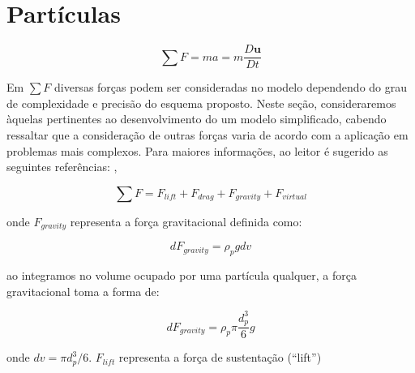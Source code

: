 \typeout{ ====================================================================}
\typeout{ ====================================================================}

\section{Partículas}

\begin{equation}
	\sum F = ma = m \frac{D \mathbf{u}}{D t}
\end{equation}

Em $\sum F$ diversas forças podem ser consideradas no modelo dependendo
do grau de complexidade e precisão do esquema proposto. Neste seção,
consideraremos àquelas pertinentes ao desenvolvimento do um modelo
simplificado, cabendo ressaltar que a consideração de outras forças
varia de acordo com a aplicação em problemas mais complexos. Para
maiores informações, ao leitor é sugerido as seguintes referências:
\cite{crowe2012}, 

\begin{equation}
	\sum F = F_{lift} + F_{drag} + F_{gravity} + F_{virtual}
\end{equation}

\noindent onde $F_{gravity}$ representa a força gravitacional definida
como: 

\begin{equation}
	dF_{gravity}
	=
	\rho_p g dv
\end{equation}

ao integramos no volume ocupado por uma partícula qualquer, a força
gravitacional toma a forma de:

\begin{equation}
	dF_{gravity}
	=
	\rho_p \pi \frac{d_p^3}{6} g
\end{equation}

\noindent onde $dv=\pi d_p^3/6$. $F_{lift}$ representa a força de
sustentação (``lift'')












